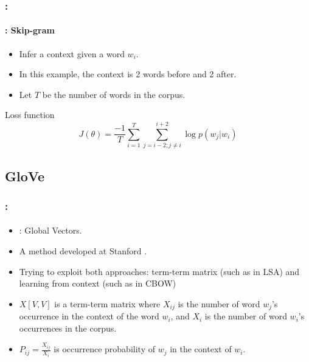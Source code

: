 \documentclass[xcolor=table]{beamer}
\begin{document}
\begin{frame}
	\frametitle{\insertshortsubtitle: \insertsection}
	\framesubtitle{\insertsubsection: Skip-gram}
	
	\begin{minipage}{.58\textwidth}
		\begin{itemize}
			\item Infer a context given a word $w_i$.
			\item In this example, the context is 2 words before and 2 after.
			\item Let $T$ be the number of words in the corpus.
		\end{itemize}
		\begin{block}{Loss function}
			\[%
			J(\theta) = \frac{-1}{T} \sum_{i=1}^{T} \sum_{j= i-2; j \ne i}^{i+2} \log p(w_j |w_i)
			\]
		\end{block}
	\end{minipage}
	\begin{minipage}{.4\textwidth}
	\end{minipage}
	
\end{frame}

\subsection{GloVe}

\begin{frame}
	\frametitle{\insertshortsubtitle: \insertsection}
	\framesubtitle{\insertsubsection}

	\begin{itemize}
		\item {}: Global Vectors.
		\item A method developed at Stanford \cite{2014-pennington-al}.
		\item Trying to exploit both approaches: term-term matrix (such as in LSA) and learning from context (such as in CBOW)
		\item $X[V, V]$ is a term-term matrix where $X_{ij}$ is the number of word $w_j$'s occurrence in the context of the word $w_i$, and $X_i$ is the number of word $w_i$'s occurrences in the corpus.
		\item $P_{ij} = \frac{X_{ij}}{X_i}$ is occurrence probability of $w_j$ in the context of $w_i$.
	\end{itemize}

\end{frame}
\end{document}
